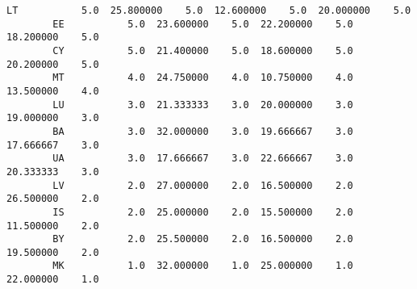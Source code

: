 \documentclass[11pt]{article}
\begin{document}
\begin{Verbatim}[commandchars=\\\{\}]
        LT           5.0  25.800000    5.0  12.600000    5.0  20.000000    5.0   
        EE           5.0  23.600000    5.0  22.200000    5.0  18.200000    5.0   
        CY           5.0  21.400000    5.0  18.600000    5.0  20.200000    5.0   
        MT           4.0  24.750000    4.0  10.750000    4.0  13.500000    4.0   
        LU           3.0  21.333333    3.0  20.000000    3.0  19.000000    3.0   
        BA           3.0  32.000000    3.0  19.666667    3.0  17.666667    3.0   
        UA           3.0  17.666667    3.0  22.666667    3.0  20.333333    3.0   
        LV           2.0  27.000000    2.0  16.500000    2.0  26.500000    2.0   
        IS           2.0  25.000000    2.0  15.500000    2.0  11.500000    2.0   
        BY           2.0  25.500000    2.0  16.500000    2.0  19.500000    2.0   
        MK           1.0  32.000000    1.0  25.000000    1.0  22.000000    1.0   
        

\end{Verbatim}
\end{document}
